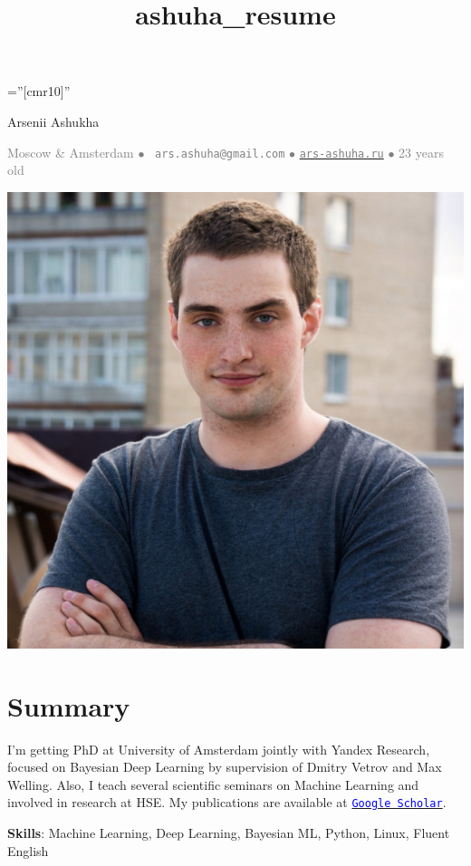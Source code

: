 \documentclass[a4paper,10pt]{article} %
\title{ashuha_resume}
\begin{document}
\pagestyle{empty} %

\font\fb=''[cmr10]'' %
\oddsidemargin=0pt 		%

\begin{center}
	{\huge Arsenii Ashukha}
\end{center}
\begin{center}
\textcolor{gray}{
Moscow \& Amsterdam $\bullet$ 
\Letter~\textcolor{gray}{\texttt{ars.ashuha@gmail.com}} $\bullet$ \href{https://ars-ashuha.ru/}{\textcolor{gray}{\texttt{ars-ashuha.ru}}} $\bullet$
23 years old} 

\end{center}
\setlength{\columnsep}{-330pt}
\begin{multicols}{2}
\includegraphics[scale=0.07]{../images/avatar_v3}

\section{Summary}
 \vspace{-0.2cm}
I'm getting PhD at University of Amsterdam jointly with Yandex Research, focused on Bayesian Deep Learning by supervision of Dmitry Vetrov and Max Welling.
Also, I teach several scientific seminars on Machine Learning and involved in research at HSE. 
My publications are available at \href{https://scholar.google.com/citations?user=IU-kuP8AAAAJ&hl=en}{\texttt{\textcolor{blue}{Google\,Scholar}}}.

\vspace{0.2cm}
\textbf{Skills}: Machine Learning, Deep Learning, Bayesian ML, Python, Linux, Fluent English

\end{multicols}
\end{document}
